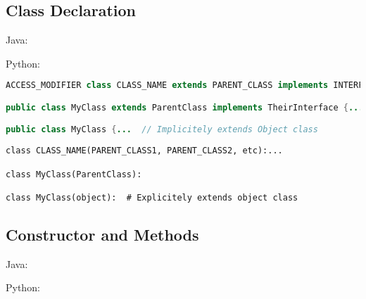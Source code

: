 \documentclass{article}
\begin{document}
\subsection{Class Declaration}
\begin{minipage}{0.45\linewidth}
    Java:
\end{minipage}
\hfill
\begin{minipage}{0.45\linewidth}
    Python:
\end{minipage}

\begin{minipage}{0.45\linewidth}
    \begin{lstlisting}[language=Java]
ACCESS_MODIFIER class CLASS_NAME extends PARENT_CLASS implements INTERFACES {...

public class MyClass extends ParentClass implements TheirInterface {...

public class MyClass {...  // Implicitely extends Object class
    \end{lstlisting}
\end{minipage}
\hfill
\begin{minipage}{0.45\linewidth}
    \begin{lstlisting}
class CLASS_NAME(PARENT_CLASS1, PARENT_CLASS2, etc):...

class MyClass(ParentClass):

class MyClass(object):  # Explicitely extends object class
    \end{lstlisting}
\end{minipage}

\subsection{Constructor and Methods}
\begin{minipage}{0.45\linewidth}
    Java:
\end{minipage}
\hfill
\begin{minipage}{0.45\linewidth}
    Python:
\end{minipage}
\end{document}
